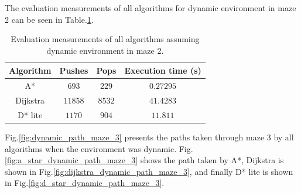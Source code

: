 The evaluation measurements of all algorithms for dynamic environment in maze 2 can be seen in Table.\:\ref{tab:metric_dynamic_maze_2}.

\begin{table}
    \centering
    \begin{tabular}{c|c|c|c}
        Algorithm   & Pushes    & Pops      & Execution time (s)    \\ \hline
        A*          & $693$     & $229$     & $0.27295$             \\
        Dijkstra    & $11858$   & $8532$    & $41.4283$             \\
        D* lite     & $1170$    & $904$     & $11.811$
    \end{tabular}
    \caption{Evaluation measurements of all algorithms assuming dynamic environment in maze 2.}
    \label{tab:metric_dynamic_maze_2}
\end{table}


Fig.\:\ref{fig:dynamic_path_maze_3} presents the paths taken through maze 3 by all algorithms when the environment was dynamic. Fig.\:\ref{fig:a_star_dynamic_path_maze_3} shows the path taken by A*, Dijkstra is shown in Fig.\:\ref{fig:dijkstra_dynamic_path_maze_3}, and finally D* lite is shown in Fig.\:\ref{fig:d_star_dynamic_path_maze_3}.

